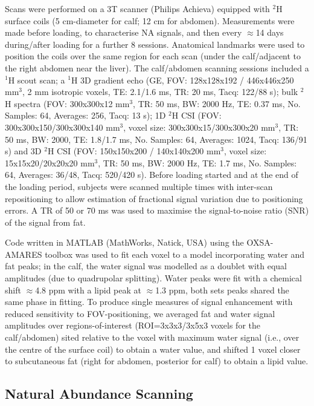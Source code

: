 \documentclass[class=article, crop=false]{standalone}
\begin{document}
Scans were performed on a 3T scanner (Philips Achieva) equipped with $^2$H surface coils (5 cm-diameter for calf; 12 cm for abdomen). Measurements were made before loading, to characterise NA signals, and then every $\approx$14 days during/after loading for a further 8 sessions. Anatomical landmarks were used to position the coils over the same region for each scan (under the calf/adjacent to the right abdomen near the liver). The calf/abdomen scanning sessions included a $^1$H scout scan; a $^1$H 3D gradient echo (GE, FOV: 128x128x192 / 446x446x250 mm$^3$, 2 mm isotropic voxels, TE: 2.1/1.6 ms, TR: 20 ms, Tacq: 122/88 s); bulk $^2$H spectra (FOV: 300x300x12 mm$^3$, TR: 50 ms, BW: 2000 Hz, TE: 0.37 ms, No. Samples: 64, Averages: 256, Tacq: 13 s); 1D $^2$H CSI (FOV: 300x300x150/300x300x140 mm$^3$, voxel size: 300x300x15/300x300x20 mm$^3$, TR: 50 ms, BW: 2000, TE: 1.8/1.7 ms, No. Samples: 64, Averages: 1024, Tacq: 136/91 s) and 3D $^2$H CSI (FOV: 150x150x200 / 140x140x200 mm$^3$, voxel size: 15x15x20/20x20x20 mm$^3$, TR: 50 ms, BW: 2000 Hz, TE: 1.7 ms, No. Samples: 64, Averages: 36/48, Tacq: 520/420 s). Before loading started and at the end of the loading period, subjects were scanned multiple times with inter-scan repositioning to allow estimation of fractional signal variation due to positioning errors. A TR of 50 or 70 ms was used to maximise the signal-to-noise ratio (SNR) of the signal from fat.


Code written in MATLAB (MathWorks, Natick, USA) using the OXSA-AMARES\cite{Purvis2017OXSA:MATLAB} toolbox was used to fit each voxel to a model incorporating water and fat peaks; in the calf, the water signal was modelled as a doublet with equal amplitudes (due to quadrupolar splitting)\cite{Gursan2022ResidualMuscle}. Water peaks were fit with a chemical shift $\approx$4.8 ppm with a lipid peak at $\approx$1.3 ppm, both sets peaks shared the same phase in fitting. To produce single measures of signal enhancement with reduced sensitivity to FOV-positioning, we averaged fat and water signal amplitudes over regions-of-interest (ROI=3x3x3/3x5x3 voxels for the calf/abdomen) sited relative to the voxel with maximum water signal (i.e., over the centre of the surface coil) to obtain a water value, and shifted 1 voxel closer to subcutaneous fat (right for abdomen, posterior for calf) to obtain a lipid value.

\subsection{Natural Abundance Scanning}
\end{document}
